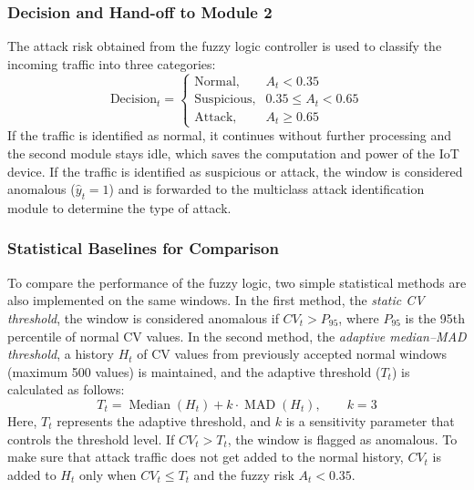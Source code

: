 \documentclass[]{interact}
\theoremstyle{plain}%
\theoremstyle{definition}
\theoremstyle{remark}
\begin{document}
\subsubsection{Decision and Hand-off to Module 2}
The attack risk obtained from the fuzzy logic controller is used to classify the incoming traffic into three categories:
\begin{equation}
  \text{Decision}_t =
  \begin{cases}
    \text{Normal},     & A_t < 0.35\\
    \text{Suspicious}, & 0.35 \le A_t < 0.65\\
    \text{Attack},     & A_t \ge 0.65
  \end{cases}
\end{equation}
If the traffic is identified as normal, it continues without further processing and the second module stays idle, which saves the computation and power of the IoT device. If the traffic is identified as suspicious or attack, the window is considered anomalous ($\hat{y}_t = 1$) and is forwarded to the multiclass attack identification module to determine the type of attack.

\subsubsection{Statistical Baselines for Comparison}
To compare the performance of the fuzzy logic, two simple statistical methods are also implemented on the same windows. In the first method, the \emph{static CV threshold}, the window is considered anomalous if $CV_t > P_{95}$, where $P_{95}$ is the 95th percentile of normal CV values. In the second method, the \emph{adaptive median--MAD threshold}, a history $H_t$ of CV values from previously accepted normal windows (maximum 500 values) is maintained, and the adaptive threshold ($T_t$) is calculated as follows:
\begin{equation}
  T_t = \operatorname{Median}(H_t) + k\cdot \operatorname{MAD}(H_t), \qquad k = 3
\end{equation}
Here, $T_t$ represents the adaptive threshold, and $k$ is a sensitivity parameter that controls the threshold level. If $CV_t > T_t$, the window is flagged as anomalous. To make sure that attack traffic does not get added to the normal history, $CV_t$ is added to $H_t$ only when $CV_t \le T_t$ and the fuzzy risk $A_t < 0.35$.


\end{document}
